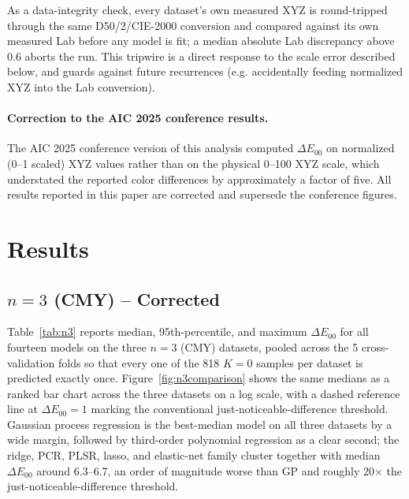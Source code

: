 \documentclass[11pt,a4paper]{article}
\begin{document}
As a data-integrity check, every dataset's own measured XYZ is round-tripped
through the same D50/2\textdegree{}/CIE-2000 conversion and compared against
its own measured Lab before any model is fit; a median absolute Lab
discrepancy above 0.6 aborts the run. This tripwire is a direct response to
the scale error described below, and guards against future recurrences (e.g.
accidentally feeding normalized XYZ into the Lab conversion).

\paragraph{Correction to the AIC 2025 conference results.}
The AIC 2025 conference version of this analysis computed $\Delta E_{00}$ on
normalized (0--1 scaled) XYZ values rather than on the physical 0--100 XYZ
scale, which understated the reported color differences by approximately a
factor of five. All results reported in this paper are corrected and
supersede the conference figures.

\section{Results}

\subsection{$n=3$ (CMY) -- Corrected}

Table~\ref{tab:n3} reports median, 95th-percentile, and maximum
$\Delta E_{00}$ for all fourteen models on the three $n=3$ (CMY) datasets,
pooled across the 5 cross-validation folds so that every one of the 818
$K=0$ samples per dataset is predicted exactly once. Figure~\ref{fig:n3comparison}
shows the same medians as a ranked bar chart across the three datasets on a
log scale, with a dashed reference line at $\Delta E_{00}=1$ marking the
conventional just-noticeable-difference threshold. Gaussian process
regression is the best-median model on all three datasets by a wide margin,
followed by third-order polynomial regression as a clear second; the ridge,
PCR, PLSR, lasso, and elastic-net family cluster together with median
$\Delta E_{00}$ around 6.3--6.7, an order of magnitude worse than GP and
roughly 20$\times$ the just-noticeable-difference threshold.
\end{document}
